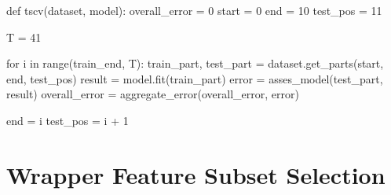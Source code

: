 \begin{code}[language = Python, frame = single,
  caption = {\textit{TSCV} pseudo code},
  label = lst:tscv-pseudo-code,
  captionpos = b][bth]
def tscv(dataset, model):
  overall_error = 0
  start = 0
  end = 10 
  test_pos = 11

  T = 41

  for i in range(train_end, T):
    train_part, test_part = dataset.get_parts(start, end,
                                              test_pos)
    result = model.fit(train_part)
    error = asses_model(test_part, result)
    overall_error = aggregate_error(overall_error, error)

    end = i
    test_pos = i + 1
\end{code}

\chapter{Wrapper Feature Subset Selection}
\label{ch:wfss}

\cite{kohavi1997wrappers}



                
                


                







